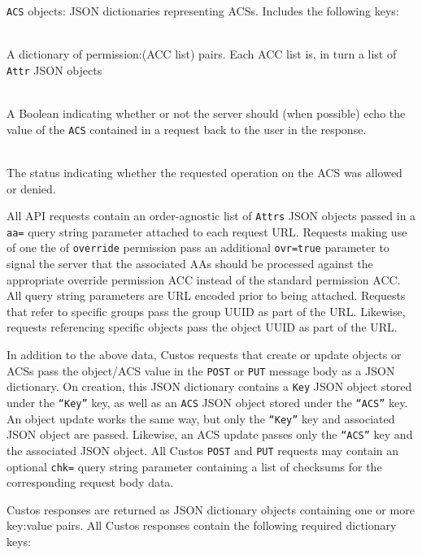 \noindent
\texttt{ACS} objects: JSON dictionaries representing ACSs. Includes
the following keys:

\begin{packed_desc}
\item[\texttt{Permissions}] \hfill \\ A dictionary of permission:(ACC
  list) pairs. Each ACC list is, in turn a list of \texttt{Attr} JSON
  objects
\item[\texttt{Echo}] \hfill \\ A Boolean indicating whether or not the
  server should (when possible) echo the value of the \texttt{ACS}
  contained in a request back to the user in the response.
\item[\texttt{Status} (Response Only)] \hfill \\ The status indicating
  whether the requested operation on the ACS was allowed or denied.
\end{packed_desc}

All API requests contain an order-agnostic list of \texttt{Attrs} JSON
objects passed in a \texttt{aa=} query string parameter attached to
each request URL. Requests making use of one the of \texttt{override}
permission pass an additional \texttt{ovr=true} parameter to signal
the server that the associated AAs should be processed against the
appropriate override permission ACC instead of the standard permission
ACC. All query string parameters are URL encoded prior to being
attached. Requests that refer to specific groups pass the group UUID
as part of the URL. Likewise, requests referencing specific objects
pass the object UUID as part of the URL.

In addition to the above data, Custos requests that create or update
objects or ACSs pass the object/ACS value in the \texttt{POST} or
\texttt{PUT} message body as a JSON dictionary. On creation, this JSON
dictionary contains a \texttt{Key} JSON object stored under the
\texttt{``Key''} key, as well as an \texttt{ACS} JSON object stored
under the \texttt{``ACS''} key. An object update works the same way,
but only the \texttt{``Key''} key and associated JSON object are
passed. Likewise, an ACS update passes only the \texttt{``ACS''} key
and the associated JSON object. All Custos \texttt{POST} and
\texttt{PUT} requests may contain an optional \texttt{chk=} query
string parameter containing a list of checksums for the corresponding
request body data.

Custos responses are returned as JSON dictionary objects containing
one or more key:value pairs. All Custos responses contain the
following required dictionary keys:

